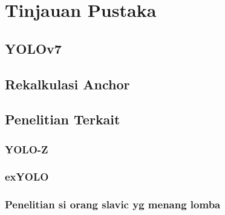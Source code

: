 \section{Tinjauan Pustaka}
\subsection{YOLOv7}
    \lipsum
\subsection{Rekalkulasi Anchor}
\subsection{}
\subsection{Penelitian Terkait}
    \subsubsection{YOLO-Z}
        \lipsum
    \subsubsection{exYOLO}
        \lipsum
    \subsubsection{Penelitian si orang slavic yg menang lomba}
        \lipsum
